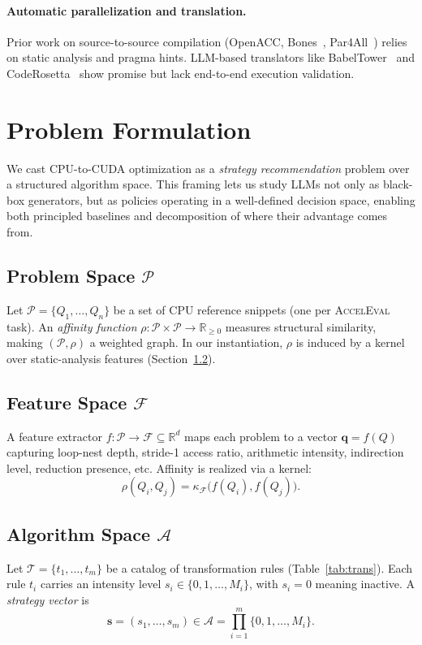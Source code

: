 \documentclass{article}
\begin{document}
\paragraph{Automatic parallelization and translation.}
Prior work on source-to-source compilation (OpenACC, Bones~\citep{bones}, Par4All~\citep{par4all}) relies on static analysis and pragma hints. LLM-based translators like BabelTower~\citep{babeltower} and CodeRosetta~\citep{coderosetta} show promise but lack end-to-end execution validation.

\section{Problem Formulation}
\label{sec:formulation}

We cast CPU-to-CUDA optimization as a \emph{strategy recommendation}
problem over a structured algorithm space. This framing lets us study
LLMs not only as black-box generators, but as policies operating in a
well-defined decision space, enabling both principled baselines and
decomposition of where their advantage comes from.

\subsection{Problem Space $\mathcal{P}$}
Let $\mathcal{P} = \{Q_1, \ldots, Q_n\}$ be a set of CPU reference
snippets (one per \textsc{AccelEval} task). An \emph{affinity function}
$\rho : \mathcal{P} \times \mathcal{P} \to \mathbb{R}_{\geq 0}$
measures structural similarity, making $(\mathcal{P}, \rho)$ a weighted
graph. In our instantiation, $\rho$ is induced by a kernel over
static-analysis features (Section~\ref{sec:feature}).

\subsection{Feature Space $\mathcal{F}$}
\label{sec:feature}
A feature extractor $f : \mathcal{P} \to \mathcal{F} \subseteq
\mathbb{R}^d$ maps each problem to a vector
$\mathbf{q} = f(Q)$ capturing loop-nest depth, stride-1 access ratio,
arithmetic intensity, indirection level, reduction presence, etc.
Affinity is realized via a kernel:
\begin{equation}
\rho(Q_i, Q_j) = \kappa_\mathcal{F}\bigl(f(Q_i), f(Q_j)\bigr).
\label{eq:affinity}
\end{equation}

\subsection{Algorithm Space $\mathcal{A}$}
Let $\mathcal{T} = \{t_1, \ldots, t_m\}$ be a catalog of
transformation rules (Table~\ref{tab:trans}). Each rule $t_i$ carries
an intensity level $s_i \in \{0, 1, \ldots, M_i\}$, with $s_i = 0$
meaning inactive. A \emph{strategy vector} is
\begin{equation}
\mathbf{s} = (s_1, \ldots, s_m) \in \mathcal{A}
   = \prod_{i=1}^{m}\{0, 1, \ldots, M_i\}.
\label{eq:strategy}
\end{equation}
\end{document}
